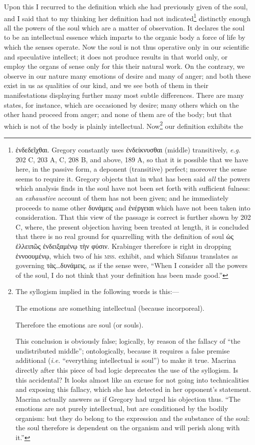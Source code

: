 Upon this I recurred to the definition which she had previously given of the soul, and I said that to my thinking her definition had not indicated\footnote{\textgreek{ἐνδεδεῖχθαι}. Gregory constantly uses \textgreek{ἐνδείκνυσθαι} (middle) transitively, \emph{e.g.} 202 C, 203 A, C, 208 B, and above, 189 A, so that it is possible that we have here, in the passive form, a deponent (transitive) perfect; moreover the sense seems to require it. Gregory objects that in what has been said \emph{all} the powers which analysis finds in the soul have not been set forth with sufficient fulness: an \emph{exhaustive} account of them has not been given; and he immediately proceeds to name other \textgreek{δυνάμεις} and \textgreek{ἐνέργειαι} which have not been taken into consideration. That this view of the passage is correct is further shown by 202 C, where, the present objection having been treated at length, it is concluded that there is no real ground for quarrelling with the definition of soul \textgreek{ὡς ἐλλειπῶς ἐνδειξαμένῳ τὴν φύσιν}. Krabinger therefore is right in dropping \textgreek{ἐννοουμένῳ}, which two of his \textsc{mss.} exhibit, and which Sifanus translates as governing \textgreek{τὰς…δυνάμεις}, as if the sense were, “When I consider all the powers of the soul, I do not think that your definition has been made good.”} distinctly enough all the powers of the soul which are a matter of observation. It declares the soul to be an intellectual essence which imparts to the organic body a force of life by which the senses operate. Now the soul is not thus operative only in our scientific and speculative intellect; it does not produce results in that world only, or employ the organs of sense only for this their natural work. On the contrary, we observe in our nature many emotions of desire and many of anger; and both these exist in us as qualities of our kind, and we see both of them in their manifestations displaying further many most subtle differences. There are many states, for instance, which are occasioned by desire; many others which on the other hand proceed from anger; and none of them are of the body; but that which is not of the body is plainly intellectual. Now\footnote{The syllogism implied in the following words is this:— \par The emotions are something intellectual (because incorporeal). \par Therefore the emotions are soul (or souls). \par This conclusion is obviously false; logically, by reason of the fallacy of “the undistributed middle”; ontologically, because it requires a false premise additional (\emph{i.e.} “everything intellectual is soul”) to make it true. Macrina directly after this piece of bad logic deprecates the use of the syllogism. Is this accidental? It looks almost like an excuse for not going into technicalities and exposing this fallacy, which she has detected in her opponent’s statement. Macrina actually answers as if Gregory had urged his objection thus. “The emotions are not purely intellectual, but are conditioned by the bodily organism: but they do belong to the expression and the substance of the soul: the soul therefore is dependent on the organism and will perish along with it.”} our definition exhibits the 